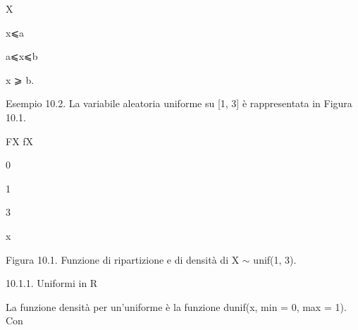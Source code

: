 \documentclass[a4paper,portrait,12pt]{article}
\begin{document}
\begin{flushleft}
X
\end{flushleft}





\begin{flushleft}
x⩽a
\end{flushleft}


\begin{flushleft}
a⩽x⩽b
\end{flushleft}


\begin{flushleft}
x ⩾ b.
\end{flushleft}





\begin{flushleft}
Esempio 10.2. La variabile aleatoria uniforme su [1, 3] \`{e} rappresentata in Figura 10.1.
\end{flushleft}





\begin{flushleft}
FX fX
\end{flushleft}





0





1





3





\begin{flushleft}
x
\end{flushleft}





\begin{flushleft}
Figura 10.1. Funzione di ripartizione e di densit\`{a} di X $\sim$ unif(1, 3).
\end{flushleft}





\begin{flushleft}
10.1.1. Uniformi in R
\end{flushleft}


\begin{flushleft}
La funzione densit\`{a} per un'uniforme \`{e} la funzione dunif(x, min = 0, max = 1). Con
\end{flushleft}
\end{document}
